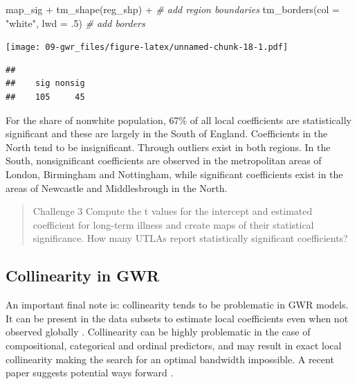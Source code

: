 \documentclass[
]{book}
\newenvironment{Shaded}{\begin{snugshade}}{\end{snugshade}}
\newcommand{\AttributeTok}[1]{\textcolor[rgb]{0.77,0.63,0.00}{#1}}
\newcommand{\CommentTok}[1]{\textcolor[rgb]{0.56,0.35,0.01}{\textit{#1}}}
\newcommand{\DecValTok}[1]{\textcolor[rgb]{0.00,0.00,0.81}{#1}}
\newcommand{\FunctionTok}[1]{\textcolor[rgb]{0.00,0.00,0.00}{#1}}
\newcommand{\NormalTok}[1]{#1}
\newcommand{\SpecialCharTok}[1]{\textcolor[rgb]{0.00,0.00,0.00}{#1}}
\newcommand{\StringTok}[1]{\textcolor[rgb]{0.31,0.60,0.02}{#1}}
\begin{document}
\begin{Shaded}
\begin{Highlighting}[]
\NormalTok{map\_sig }\SpecialCharTok{+} \FunctionTok{tm\_shape}\NormalTok{(reg\_shp) }\SpecialCharTok{+} \CommentTok{\# add region boundaries}
  \FunctionTok{tm\_borders}\NormalTok{(}\AttributeTok{col =} \StringTok{"white"}\NormalTok{, }\AttributeTok{lwd =}\NormalTok{ .}\DecValTok{5}\NormalTok{) }\CommentTok{\# add borders}
\end{Highlighting}
\end{Shaded}

\texttt{[image: 09-gwr\_files/figure-latex/unnamed-chunk-18-1.pdf]}

\begin{Shaded}
\end{Shaded}

\begin{verbatim}
## 
##    sig nonsig 
##    105     45
\end{verbatim}

For the share of nonwhite population, 67\% of all local coefficients are statistically significant and these are largely in the South of England. Coefficients in the North tend to be insignificant. Through outliers exist in both regions. In the South, nonsignificant coefficients are observed in the metropolitan areas of London, Birmingham and Nottingham, while significant coefficients exist in the areas of Newcastle and Middlesbrough in the North.

\begin{quote}
Challenge 3
Compute the t values for the intercept and estimated coefficient for long-term illness and create maps of their statistical significance.
How many UTLAs report statistically significant coefficients?
\end{quote}

\hypertarget{collinearity-in-gwr}{%
\subsection{Collinearity in GWR}\label{collinearity-in-gwr}}

An important final note is: collinearity tends to be problematic in GWR models. It can be present in the data subsets to estimate local coefficients even when not observed globally \citet{wheeler2005multicollinearity}. Collinearity can be highly problematic in the case of compositional, categorical and ordinal predictors, and may result in exact local collinearity making the search for an optimal bandwidth impossible. A recent paper suggests potential ways forward \citep{comber2020gwr}.
\end{document}
